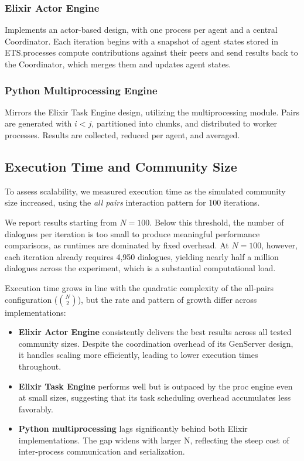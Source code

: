 \documentclass[
]{ceurart}
\begin{document}
\subsubsection{Elixir Actor Engine}
Implements an actor-based design, with one process per agent and a central Coordinator. Each iteration begins with a snapshot of agent states stored in ETS.\@Agent processes compute contributions against their peers and send results back to the Coordinator, which merges them and updates agent states.

\subsubsection{Python Multiprocessing Engine}
Mirrors the Elixir Task Engine design, utilizing the multiprocessing module. Pairs are generated with $i < j$, partitioned into chunks, and distributed to worker processes. Results are collected, reduced per agent, and averaged.


\subsection{Execution Time and Community Size}
To assess scalability, we measured execution time as the simulated community size increased, using the \emph{all pairs} interaction pattern for 100 iterations.

We report results starting from $N=100$. Below this threshold, the number of dialogues per iteration is too small to produce meaningful performance comparisons, as runtimes are dominated by fixed overhead. At $N=100$, however, each iteration already requires 4,950 dialogues, yielding nearly half a million dialogues across the experiment, which is a substantial computational load.

Execution time grows in line with the quadratic complexity of the all-pairs configuration ($\binom{N}{2}$), but the rate and pattern of growth differ across implementations:

\begin{itemize}
\item \textbf{Elixir Actor Engine} consistently delivers the best results across all tested community sizes. Despite the coordination overhead of its GenServer design, it handles scaling more efficiently, leading to lower execution times throughout.
\item \textbf{Elixir Task Engine} performs well but is outpaced by the proc engine even at small sizes, suggesting that its task scheduling overhead accumulates less favorably.
\item \textbf{Python multiprocessing} lags significantly behind both Elixir implementations. The gap widens with larger N, reflecting the steep cost of inter-process communication and serialization.
\end{itemize}
\end{document}
